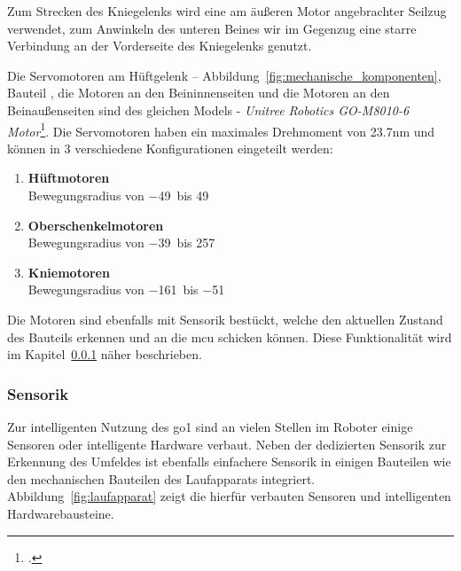 \noindent Zum Strecken des Kniegelenks wird eine am äußeren Motor angebrachter Seilzug  verwendet,
zum Anwinkeln des unteren Beines wir im Gegenzug eine starre Verbindung  an der Vorderseite des Kniegelenks genutzt.


Die Servomotoren am Hüftgelenk -- Abbildung~\ref{fig:mechanische_komponenten}, Bauteil , die Motoren an den Beininnenseiten 
und die Motoren an den Beinaußenseiten  sind des gleichen Models -
\emph{Unitree Robotics GO-M8010-6 Motor}\footcite{go_motor}.
Die Servomotoren haben ein maximales Drehmoment von \num{23.7}\gls{nm} und können in 3 verschiedene Konfigurationen
eingeteilt werden:
\begin{enumerate}
    \item \textbf{Hüftmotoren}\\
    Bewegungsradius von \num{-49}\textdegree~bis \num{49}\textdegree
    \item \textbf{Oberschenkelmotoren}\\
    Bewegungsradius von \num{-39}\textdegree~bis \num{257}\textdegree
    \item \textbf{Kniemotoren}\\
    Bewegungsradius von \num{-161}\textdegree~bis \num{-51}\textdegree
\end{enumerate}
Die Motoren sind ebenfalls mit Sensorik bestückt, welche den aktuellen Zustand des Bauteils erkennen und
an die \gls{mcu} schicken können.
Diese Funktionalität wird im Kapitel~\ref{subsubsec:sensorik} näher beschrieben.

\subsubsection{Sensorik}
\label{subsubsec:sensorik}

Zur intelligenten Nutzung des \gls{go1} sind an vielen Stellen im Roboter
einige Sensoren oder intelligente Hardware verbaut.
Neben der dedizierten Sensorik zur Erkennung des Umfeldes ist ebenfalls einfachere Sensorik
in einigen Bauteilen wie den mechanischen Bauteilen des Laufapparats integriert.
Abbildung~\ref{fig:laufapparat} zeigt die hierfür verbauten Sensoren und intelligenten Hardwarebausteine.

